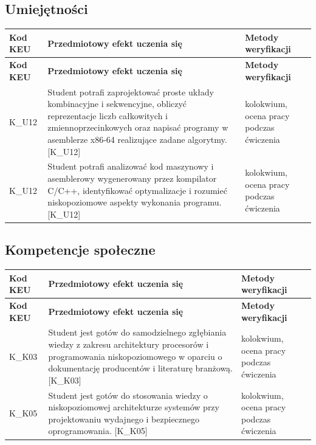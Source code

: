 \documentclass[12pt, a4paper]{article}
\newcommand{\thdrule}{\noalign{\global\setlength{\extrarowheight}{0pt}}}
\newcommand{\thdend}{\noalign{\global\setlength{\extrarowheight}{3pt}}}
\begin{document}
\subsection*{Umiejętności}
{\scriptsize
\begin{longtable}{m{1.6cm}m{9.0cm}m{4.2cm}}
\thdrule\toprule
\rowcolor{pjatkRed} {\color{white}\footnotesize\textbf{\vphantom{Ag}Kod KEU}} & {\color{white}\footnotesize\textbf{\vphantom{Ag}Przedmiotowy efekt uczenia się}} & {\color{white}\footnotesize\textbf{\vphantom{Ag}Metody weryfikacji}} \\
\midrule\thdend
\endfirsthead
\thdrule\toprule
\rowcolor{pjatkRed} {\color{white}\footnotesize\textbf{\vphantom{Ag}Kod KEU}} & {\color{white}\footnotesize\textbf{\vphantom{Ag}Przedmiotowy efekt uczenia się}} & {\color{white}\footnotesize\textbf{\vphantom{Ag}Metody weryfikacji}} \\
\midrule\thdend
\endhead
  \rowcolor{tableRowLight} K\_U12 & Student potrafi zaprojektować proste układy kombinacyjne i sekwencyjne, obliczyć reprezentacje liczb całkowitych i zmiennoprzecinkowych oraz napisać programy w asemblerze x86-64 realizujące zadane algorytmy. {[}K\_U12{]} & kolokwium, ocena pracy podczas ćwiczenia \\
  \rowcolor{tableRowAlt} K\_U12 & Student potrafi analizować kod maszynowy i asemblerowy wygenerowany przez kompilator C/C++, identyfikować optymalizacje i rozumieć niskopoziomowe aspekty wykonania programu. {[}K\_U12{]} & kolokwium, ocena pracy podczas ćwiczenia \\
\bottomrule
\end{longtable}}

\subsection*{Kompetencje społeczne}
{\scriptsize
\begin{longtable}{m{1.6cm}m{9.0cm}m{4.2cm}}
\thdrule\toprule
\rowcolor{pjatkRed} {\color{white}\footnotesize\textbf{\vphantom{Ag}Kod KEU}} & {\color{white}\footnotesize\textbf{\vphantom{Ag}Przedmiotowy efekt uczenia się}} & {\color{white}\footnotesize\textbf{\vphantom{Ag}Metody weryfikacji}} \\
\midrule\thdend
\endfirsthead
\thdrule\toprule
\rowcolor{pjatkRed} {\color{white}\footnotesize\textbf{\vphantom{Ag}Kod KEU}} & {\color{white}\footnotesize\textbf{\vphantom{Ag}Przedmiotowy efekt uczenia się}} & {\color{white}\footnotesize\textbf{\vphantom{Ag}Metody weryfikacji}} \\
\midrule\thdend
\endhead
  \rowcolor{tableRowLight} K\_K03 & Student jest gotów do samodzielnego zgłębiania wiedzy z zakresu architektury procesorów i programowania niskopoziomowego w oparciu o dokumentację producentów i literaturę branżową. {[}K\_K03{]} & kolokwium, ocena pracy podczas ćwiczenia \\
  \rowcolor{tableRowAlt} K\_K05 & Student jest gotów do stosowania wiedzy o niskopoziomowej architekturze systemów przy projektowaniu wydajnego i bezpiecznego oprogramowania. {[}K\_K05{]} & kolokwium, ocena pracy podczas ćwiczenia \\
\bottomrule
\end{longtable}}
\end{document}
